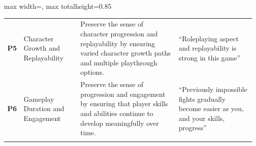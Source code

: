 \begin{table}[ht]
\begin{adjustbox}{max width=\linewidth, max totalheight=0.85\textheight}
\begin{tabular}{l >{\raggedright\arraybackslash}p{} >{\raggedright\arraybackslash}p{} >{\raggedright\arraybackslash}p{}}
    \arrayrulecolor{prRule}\hdashline
    \textbf{P5} & Character Growth and Replayability & Preserve the sense of character progression and replayability by ensuring varied character growth paths and multiple playthrough options. & ``Roleplaying aspect and replayability is strong in this game'' \\
    \arrayrulecolor{prRule}\hdashline
    \textbf{P6} & Gameplay Duration and Engagement & Preserve the sense of progression and engagement by ensuring that player skills and abilities continue to develop meaningfully over time. & ``Previously impossible fights gradually become easier as you, and your skills, progress'' \\
    \arrayrulecolor{black}\bottomrule
  \end{tabular}
  \end{adjustbox}
\end{table}
